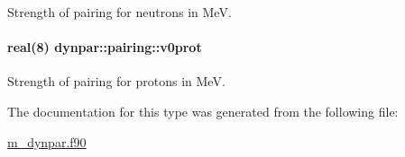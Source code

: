 Strength of pairing for neutrons in MeV. 

\paragraph[{\texorpdfstring{v0prot}{v0prot}}]{\setlength{\rightskip}{0pt plus 5cm}real(8) dynpar\+::pairing\+::v0prot}\hypertarget{structdynpar_1_1pairing_a59eab10ac4785d6ac1eac3fcfa894dc2}{}\label{structdynpar_1_1pairing_a59eab10ac4785d6ac1eac3fcfa894dc2}


Strength of pairing for protons in MeV. 



The documentation for this type was generated from the following file\+:\begin{DoxyCompactItemize}
\item 
\hyperlink{m__dynpar_8f90}{m\+\_\+dynpar.\+f90}\end{DoxyCompactItemize}
